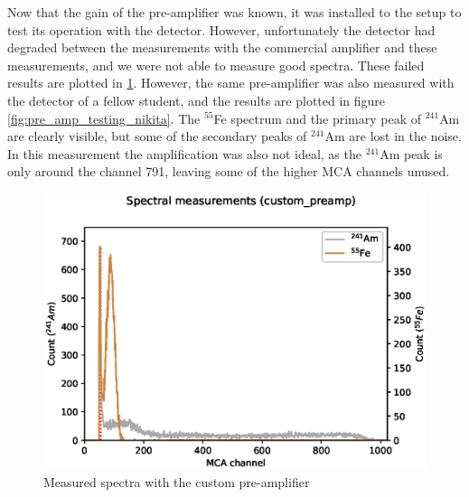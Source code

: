 \documentclass[a4paper]{article}
\begin{document}
\begin{appendices}
\FloatBarrier
Now that the gain of the pre-amplifier was known, it was installed to the setup to test its operation with the detector.
However, unfortunately the detector had degraded between the measurements with the commercial amplifier and these measurements, and we were not able to measure good spectra.
These failed results are plotted in \ref{fig:pre_amp_testing}.
However, the same pre-amplifier was also measured with the detector of a fellow student, and the results are plotted in figure \ref{fig:pre_amp_testing_nikita}.
The $^{55}$Fe spectrum and the primary peak of $^{241}$Am are clearly visible, but some of the secondary peaks of $^{241}$Am are lost in the noise.
In this measurement the amplification was also not ideal, as the $^{241}$Am peak is only around the channel 791, leaving some of the higher MCA channels unused.

\begin{figure}[ht!]
\centering
\includegraphics[width=\textwidth]{fig/python/spectra_custom_preamp}
\caption{Measured spectra with the custom pre-amplifier}
\label{fig:pre_amp_testing}
\end{figure}


\end{appendices}
\end{document}
